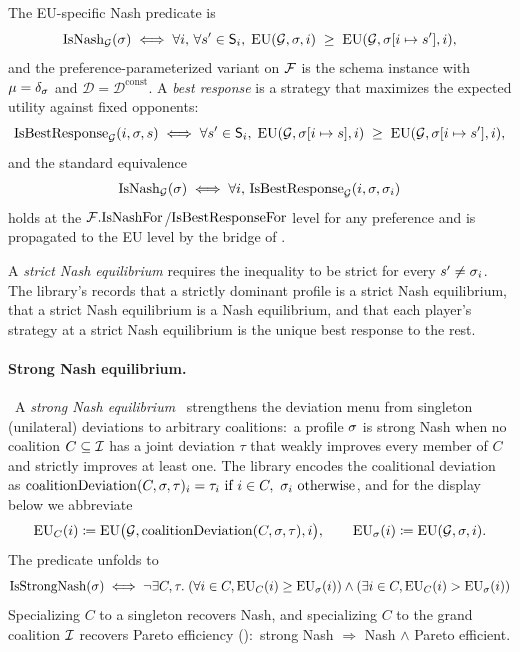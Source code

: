 The EU-specific Nash predicate is
\begin{equation}
\label{eq:nash}
  \mathrm{IsNash}_{\mathcal{G}}(\sigma) \;\Longleftrightarrow\;
    \forall i,\, \forall s' \in \mathsf{S}_i,\;
    \mathrm{EU}(\mathcal{G}, \sigma, i) \;\ge\; \mathrm{EU}(\mathcal{G}, \sigma[i \mapsto s'], i),
\end{equation}
and the preference-parameterized variant on $\mathcal{F}$ is the schema
instance with $\mu = \delta_{\sigma}$ and $\mathcal{D} =
\mathcal{D}^{\mathrm{const}}$.  A \emph{best response} is a
strategy that maximizes the expected utility against fixed
opponents:
\begin{equation}
\label{eq:br}
  \mathrm{IsBestResponse}_{\mathcal{G}}(i, \sigma, s) \;\Longleftrightarrow\;
    \forall s' \in \mathsf{S}_i,\;
    \mathrm{EU}(\mathcal{G}, \sigma[i \mapsto s], i) \;\ge\;
    \mathrm{EU}(\mathcal{G}, \sigma[i \mapsto s'], i),
\end{equation}
and the standard equivalence
\[
  \mathrm{IsNash}_{\mathcal{G}}(\sigma) \;\Longleftrightarrow\;
    \forall i,\, \mathrm{IsBestResponse}_{\mathcal{G}}(i, \sigma, \sigma_i)
\]
holds at the $\mathcal{F}.\mathrm{IsNashFor}$/$\mathrm{IsBestResponseFor}$ level for any
preference and is propagated to the EU level by the bridge of
.

A \emph{strict Nash equilibrium} requires the inequality to be
strict for every $s' \neq \sigma_i$.  The library's
 records that a strictly dominant
profile is a strict Nash equilibrium, that a strict Nash equilibrium
is a Nash equilibrium, and that each player's strategy at a strict
Nash equilibrium is the unique best response to the rest.

\paragraph{Strong Nash equilibrium.}\
A \emph{strong Nash equilibrium}~\citep{Aumann1959} strengthens
the deviation menu from singleton (unilateral) deviations to
arbitrary coalitions:\ a profile $\sigma$ is strong Nash when no
coalition $C \subseteq \mathcal{I}$ has a joint deviation $\tau$ that
weakly improves every member of $C$ and strictly improves at
least one.  The library encodes the coalitional deviation as
$\mathrm{coalitionDeviation}(C, \sigma, \tau)_i =
\tau_i\ \text{if}\ i \in C,\ \sigma_i\ \text{otherwise}$, and
for the display below we abbreviate
\[
  \mathrm{EU}_C(i) \coloneqq
    \mathrm{EU}\bigl(\mathcal{G}, \mathrm{coalitionDeviation}(C,\sigma,\tau), i\bigr),
  \qquad
  \mathrm{EU}_{\sigma}(i) \coloneqq \mathrm{EU}(\mathcal{G},\sigma,i).
\]
The predicate unfolds to
\[
  \mathrm{IsStrongNash}(\sigma) \;\Longleftrightarrow\;
    \neg \exists C, \tau.\;
    (\forall i \in C, \mathrm{EU}_C(i) \ge \mathrm{EU}_{\sigma}(i)) \land
    (\exists i \in C, \mathrm{EU}_C(i) > \mathrm{EU}_{\sigma}(i))
\]
Specializing $C$ to a singleton recovers Nash, and specializing $C$
to the grand coalition $\mathcal{I}$ recovers
Pareto efficiency ():\ strong
Nash $\Rightarrow$ Nash $\land$ Pareto efficient.

